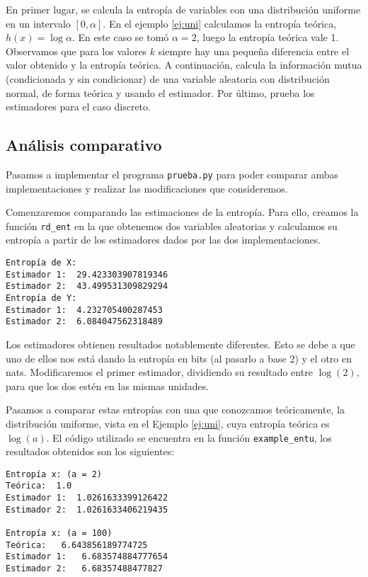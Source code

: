 \documentclass[10pt,a4paper]{article} %
\theoremstyle{definition}
\begin{document}
En primer lugar, se calcula la entropía de variables con una distribución uniforme en un intervalo $[0,\alpha]$. En el ejemplo \ref{ej:uni} calculamos la entropía teórica, $h(x) = \log \alpha$. En este caso se tomó $\alpha = 2$, luego la entropía teórica vale 1. Observamos que para los valores $k$ siempre hay una pequeña diferencia entre el valor obtenido y la entropía teórica. A continuación, calcula la información mutua (condicionada y sin condicionar) de una variable aleatoria con distribución normal, de forma teórica y usando el estimador. Por último, prueba los estimadores para el caso discreto. 

\subsection{Análisis comparativo}

Pasamos a implementar el programa \texttt{prueba.py} para poder comparar ambas implementaciones y realizar las modificaciones que consideremos.

Comenzaremos comparando las estimaciones de la entropía. Para ello, creamos la función \texttt{rd\_ent} en la que obtenemos dos variables aleatorias y calculamos su entropía a partir de los estimadores dados por las dos implementaciones.

\begin{lstlisting}
Entropía de X:
Estimador 1:  29.423303907819346
Estimador 2:  43.499531309829294
Entropía de Y:
Estimador 1:  4.232705400287453
Estimador 2:  6.084047562318489
\end{lstlisting}

Los estimadores obtienen resultados notablemente diferentes. Esto se debe a que uno de ellos nos está dando la entropía en bits (al pasarlo a base 2) y el otro en nats. Modificaremos el primer estimador, dividiendo su resultado entre $\log(2)$, para que los dos estén en las mismas unidades.

Pasamos a comparar estas entropías con una que conozcamos teóricamente, la distribución uniforme, vista en el Ejemplo \ref{ej:uni}, cuya entropía teórica es $\log(a)$. El código utilizado se encuentra en la función \texttt{example\_entu}, los resultados obtenidos son los siguientes:

\begin{lstlisting}
Entropía x: (a = 2)
Teórica:  1.0
Estimador 1:  1.0261633399126422
Estimador 2:  1.0261633406219435

Entropía x: (a = 100)
Teórica:   6.643856189774725
Estimador 1:   6.683574884777654
Estimador 2:   6.68357488477827
\end{lstlisting}
\end{document}
